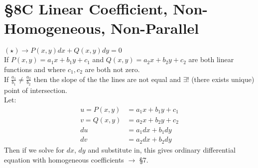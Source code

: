\section*{\S 8C Linear Coefficient, Non-Homogeneous, Non-Parallel}
$(\star ) \rightarrow P(x,y)dx +Q(x,y)dy=0$\\
If $P(x,y)= a_1x+b_1y+c_1$ and $Q(x,y)= a_2x+b_2y+c_2$ are both linear functions and where $c_1, c_2$ are both not zero.\\
If $\frac{a_1}{b_1}\neq \frac{a_2}{b_2}$ then the slope of the the lines are not equal and $\exists !$ (there exists unique) point of intersection.\\
Let:
\begin{align*}
    u=P(x,y)&=a_1x+b_1y+c_1\\
    v= Q(x,y)&= a_2x+b_2y+c_2\\
    du&= a_1dx+b_1dy\\
    dv&=a_2dx+b_2dy
\end{align*}
Then if we solve for $dx$, $dy$ and substitute in, this gives ordinary differential equation with homogeneous coefficients $\rightarrow$ \S 7.
